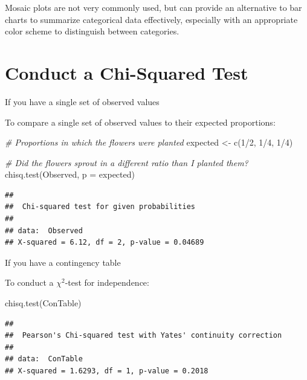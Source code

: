 \documentclass[
]{book}
\newenvironment{Shaded}{\begin{snugshade}}{\end{snugshade}}
\newcommand{\AttributeTok}[1]{\textcolor[rgb]{0.77,0.63,0.00}{#1}}
\newcommand{\CommentTok}[1]{\textcolor[rgb]{0.56,0.35,0.01}{\textit{#1}}}
\newcommand{\DecValTok}[1]{\textcolor[rgb]{0.00,0.00,0.81}{#1}}
\newcommand{\FunctionTok}[1]{\textcolor[rgb]{0.00,0.00,0.00}{#1}}
\newcommand{\NormalTok}[1]{#1}
\newcommand{\OtherTok}[1]{\textcolor[rgb]{0.56,0.35,0.01}{#1}}
\newcommand{\SpecialCharTok}[1]{\textcolor[rgb]{0.00,0.00,0.00}{#1}}
\begin{document}
Mosaic plots are not very commonly used, but can provide an alternative to bar charts to summarize categorical data effectively, especially with an appropriate color scheme to distinguish between categories.

\hypertarget{conduct-a-chi-squared-test}{%
\section{Conduct a Chi-Squared Test}\label{conduct-a-chi-squared-test}}

If you have a single set of observed values

To compare a single set of observed values to their expected proportions:

\begin{Shaded}
\begin{Highlighting}[]
\CommentTok{\# Proportions in which the flowers were planted}
\NormalTok{expected }\OtherTok{\textless{}{-}} \FunctionTok{c}\NormalTok{(}\DecValTok{1}\SpecialCharTok{/}\DecValTok{2}\NormalTok{, }\DecValTok{1}\SpecialCharTok{/}\DecValTok{4}\NormalTok{, }\DecValTok{1}\SpecialCharTok{/}\DecValTok{4}\NormalTok{)}

\CommentTok{\# Did the flowers sprout in a different ratio than I planted them?}
\FunctionTok{chisq.test}\NormalTok{(Observed, }\AttributeTok{p =}\NormalTok{ expected)}
\end{Highlighting}
\end{Shaded}

\begin{verbatim}
## 
##  Chi-squared test for given probabilities
## 
## data:  Observed
## X-squared = 6.12, df = 2, p-value = 0.04689
\end{verbatim}

If you have a contingency table

To conduct a \(\chi^2\)-test for independence:

\begin{Shaded}
\begin{Highlighting}[]
\FunctionTok{chisq.test}\NormalTok{(ConTable)}
\end{Highlighting}
\end{Shaded}

\begin{verbatim}
## 
##  Pearson's Chi-squared test with Yates' continuity correction
## 
## data:  ConTable
## X-squared = 1.6293, df = 1, p-value = 0.2018
\end{verbatim}
\end{document}
